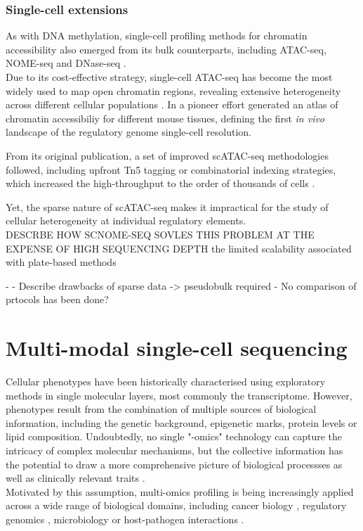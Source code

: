 \subsubsection{Single-cell extensions}
As with DNA methylation, single-cell profiling methods for chromatin accessibility also emerged from its bulk counterparts, including ATAC-seq\cite{Buenrostro2015a}, NOME-seq \cite{Pott2016} and DNase-seq \cite{Jin2015}.
\\

Due to its cost-effective strategy, single-cell ATAC-seq has become the most widely used to map open chromatin regions, revealing extensive heterogeneity across different cellular populations \cite{Cusanovic2015,Cao2018,OTHERS}. In a pioneer effort \cite{Cusanovich2018} generated an atlas of chromatin accessibiliy for different mouse tissues, defining the first \textit{in vivo} landscape of the regulatory genome single-cell resolution.

From its original publication, a set of improved scATAC-seq methodologies followed, including upfront Tn5 tagging\cite{Chen2018} or combinatorial indexing strategies, which increased the high-throughput to the order of thousands of cells \cite{Cusanovich2015a}. 

Yet, the sparse nature of scATAC-seq makes it impractical for the study of cellular heterogeneity at individual regulatory elements. \\
	DESCRBE HOW SCNOME-SEQ SOVLES THIS PROBLEM AT THE EXPENSE OF HIGH SEQUENCING DEPTH
	the limited scalability associated with plate-based methods


- 
- Describe drawbacks of sparse data -> pseudobulk required
- No comparison of prtocols has been done?


\section{Multi-modal single-cell sequencing}

Cellular phenotypes have been historically characterised using exploratory methods in single molecular layers, most commonly the transcriptome. However, phenotypes result from the combination of multiple sources of biological information, including the genetic background, epigenetic marks, protein levels or lipid composition. Undoubtedly, no single "-omics" technology can capture the intricacy of complex molecular mechanisms, but the collective information has the potential to draw a more comprehensive picture of biological processses as well as clinically relevant traits \cite{Hasin2017,Ritchie2015}.\\
Motivated by this assumption, multi-omics profiling is being increasingly applied across a wide range of biological domains, including cancer biology \cite{Akavia2010,Gerstung2015}, regulatory genomics \cite{Chen2016}, microbiology \cite{Kim2016} or host-pathogen interactions \cite{TO-DO soderholm2016}.\\ 

